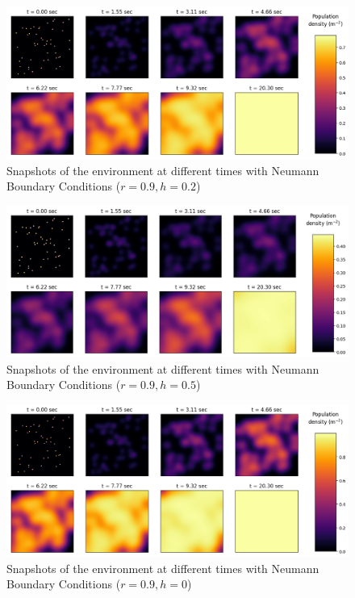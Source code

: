\begin{figure}[H]
    \centering
    \includegraphics[width=1\linewidth]{Figures/5/5b/neumann.png}
    \caption{Snapshots of the environment at different times with Neumann Boundary Conditions ($r=0.9,h=0.2$)}
\end{figure}

\begin{figure}[H]
    \centering
    \includegraphics[width=1\linewidth]{Figures/5/5b/neumann_h5.png}
    \caption{Snapshots of the environment at different times with Neumann Boundary Conditions ($r=0.9,h=0.5$)}
\end{figure}

\begin{figure}[H]
    \centering
    \includegraphics[width=1\linewidth]{Figures/5/5b/neumann_h0.png}
    \caption{Snapshots of the environment at different times with Neumann Boundary Conditions ($r=0.9,h=0$)}
\end{figure}

